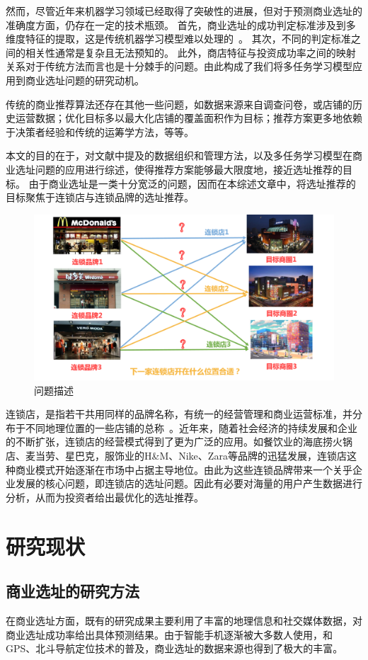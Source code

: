 \documentclass[UTF8]{llncs}
\begin{document}
然而，尽管近年来机器学习领域已经取得了突破性的进展，但对于预测商业选址的准确度方面，仍存在一定的技术瓶颈。
首先，商业选址的成功判定标准涉及到多维度特征的提取，这是传统机器学习模型难以处理的~\cite{ZhouLiuCai}。
其次，不同的判定标准之间的相关性通常是复杂且无法预知的。
此外，商店特征与投资成功率之间的映射关系对于传统方法而言也是十分棘手的问题。由此构成了我们将多任务学习模型应用到商业选址问题的研究动机。

传统的商业推荐算法还存在其他一些问题，如数据来源来自调查问卷，或店铺的历史运营数据；优化目标多以最大化店铺的覆盖面积作为目标；推荐方案更多地依赖于决策者经验和传统的运筹学方法，等等。

本文的目的在于，对文献中提及的数据组织和管理方法，以及多任务学习模型在商业选址问题的应用进行综述，使得推荐方案能够最大限度地，接近选址推荐的目标。
由于商业选址是一类十分宽泛的问题，因而在本综述文章中，将选址推荐的目标聚焦于连锁店与连锁品牌的选址推荐。
\begin{figure}
	\centering
	\includegraphics[width=0.8\columnwidth]{figures/intro.png}
	\caption{问题描述}
	\label{intro}
\end{figure}

连锁店，是指若干共用同样的品牌名称，有统一的经营管理和商业运营标准，并分布于不同地理位置的一些店铺的总称~\cite{DongHongAn}。近年来，随着社会经济的持续发展和企业的不断扩张，连锁店的经营模式得到了更为广泛的应用。如餐饮业的海底捞火锅店、麦当劳、星巴克，服饰业的H\&M、Nike、Zara等品牌的迅猛发展，连锁店这种商业模式开始逐渐在市场中占据主导地位。由此为这些连锁品牌带来一个关乎企业发展的核心问题，即连锁店的选址问题。因此有必要对海量的用户产生数据进行分析，从而为投资者给出最优化的选址推荐。


\section{研究现状}
\subsection{商业选址的研究方法}
在商业选址方面，既有的研究成果主要利用了丰富的地理信息和社交媒体数据，对商业选址成功率给出具体预测结果。由于智能手机逐渐被大多数人使用，和GPS、北斗导航定位技术的普及，商业选址的数据来源也得到了极大的丰富。
\end{document}
